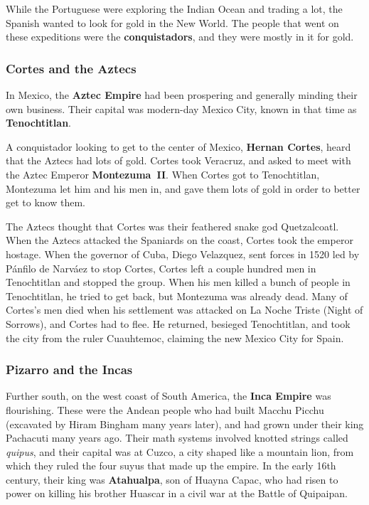 While the Portuguese were exploring the Indian Ocean and trading a lot,
the Spanish wanted to look for gold in the New World.
The people that went on these expeditions were the \textbf{conquistadors},
and they were mostly in it for gold.

\subsubsection*{Cortes and the Aztecs}

In Mexico, the \textbf{Aztec Empire} had been prospering and generally minding their own business.
Their capital was modern-day Mexico City, known in that time as \textbf{Tenochtitlan}.

A conquistador looking to get to the center of Mexico,
\textbf{Hernan Cortes}, heard that the Aztecs had lots of gold.
Cortes took Veracruz, and asked to meet with the Aztec Emperor \textbf{Montezuma~II}.
When Cortes got to Tenochtitlan, Montezuma let him and his men in,
and gave them lots of gold in order to better get to know them.

The Aztecs thought that Cortes was their feathered snake god Quetzalcoatl.
When the Aztecs attacked the Spaniards on the coast, Cortes took the emperor hostage.
When the governor of Cuba, Diego Velazquez, sent forces in 1520 led by P\'anfilo de Narv\'aez to stop Cortes,
Cortes left a couple hundred men in Tenochtitlan and stopped the group.
When his men killed a bunch of people in Tenochtitlan,
he tried to get back, but Montezuma was already dead.
Many of Cortes's men died when his settlement was attacked on La Noche Triste (Night of Sorrows),
and Cortes had to flee.
He returned, besieged Tenochtitlan, and took the city from the ruler Cuauhtemoc,
claiming the new Mexico City for Spain.

\subsubsection*{Pizarro and the Incas}

Further south, on the west coast of South America, the \textbf{Inca Empire} was flourishing.
These were the Andean people who had built Macchu Picchu (excavated by Hiram Bingham many years later),
and had grown under their king Pachacuti many years ago.
Their math systems involved knotted strings called \textit{quipus},
and their capital was at Cuzco, a city shaped like a mountain lion,
from which they ruled the four suyus that made up the empire.
In the early 16th century, their king was \textbf{Atahualpa}, son of Huayna Capac,
who had risen to power on killing his brother Huascar in a civil war at the Battle of Quipaipan.

